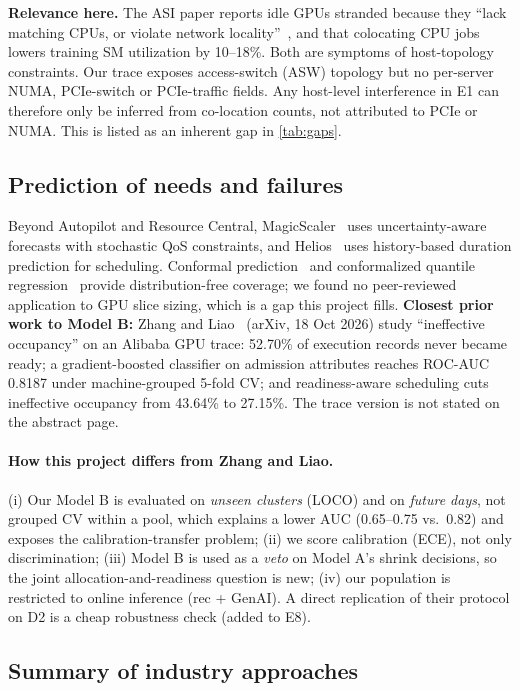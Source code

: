 \noindent\textbf{Relevance here.} The ASI paper reports idle GPUs stranded because they ``lack matching CPUs, or violate network locality''~\cite{li2026asi}, and that colocating CPU jobs lowers training SM utilization by 10--18\%. Both are symptoms of host-topology constraints. Our trace exposes access-switch (ASW) topology but no per-server NUMA, PCIe-switch or PCIe-traffic fields. Any host-level interference in E1 can therefore only be inferred from co-location counts, not attributed to PCIe or NUMA. This is listed as an inherent gap in \cref{tab:gaps}.

\subsection{Prediction of needs and failures}
Beyond Autopilot and Resource Central, MagicScaler~\cite{pan2023magicscaler} uses uncertainty-aware forecasts with stochastic QoS constraints, and Helios~\cite{hu2021helios} uses history-based duration prediction for scheduling. Conformal prediction~\cite{angelopoulos2021gentle} and conformalized quantile regression~\cite{romano2019cqr} provide distribution-free coverage; we found no peer-reviewed application to GPU slice sizing, which is a gap this project fills. \textbf{Closest prior work to Model B:} Zhang and Liao~\cite{zhang2026ineffective} (arXiv, 18 Oct 2026) study ``ineffective occupancy'' on an Alibaba GPU trace: 52.70\% of execution records never became ready; a gradient-boosted classifier on admission attributes reaches ROC-AUC 0.8187 under machine-grouped 5-fold CV; and readiness-aware scheduling cuts ineffective occupancy from 43.64\% to 27.15\%. The trace version is not stated on the abstract page.

\paragraph{How this project differs from Zhang and Liao.} (i) Our Model B is evaluated on \emph{unseen clusters} (LOCO) and on \emph{future days}, not grouped CV within a pool, which explains a lower AUC (0.65--0.75 vs.\ 0.82) and exposes the calibration-transfer problem; (ii) we score calibration (ECE), not only discrimination; (iii) Model B is used as a \emph{veto} on Model A's shrink decisions, so the joint allocation-and-readiness question is new; (iv) our population is restricted to online inference (rec + GenAI). A direct replication of their protocol on D2 is a cheap robustness check (added to E8).

\subsection{Summary of industry approaches}

